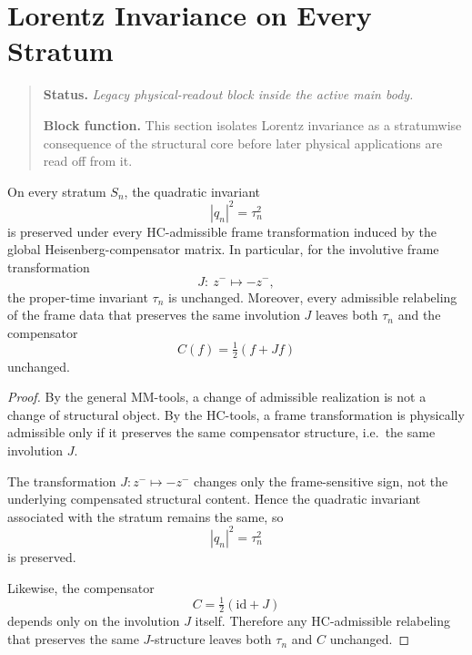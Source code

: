 \section{Lorentz Invariance on Every Stratum}
\begin{quote}\small
\noindent\textbf{Status.} \emph{Legacy physical-readout block inside the active main body.}\par
\noindent\textbf{Block function.} This section isolates Lorentz invariance as a stratumwise consequence of the structural core before later physical applications are read off from it.
\end{quote}
\label{sec:lorentz}

\begin{theorem}\label{thm:lorentz}
On every stratum $S_n$, the quadratic invariant
\[
|q_n|^2=\tau_n^2
\]
is preserved under every HC-admissible frame transformation induced by
the global Heisenberg-compensator matrix.
In particular, for the involutive frame transformation
\[
J:\ z^- \mapsto -z^-,
\]
the proper-time invariant $\tau_n$ is unchanged.
Moreover, every admissible relabeling of the frame data that preserves
the same involution $J$ leaves both $\tau_n$ and the compensator
\[
C(f)=\tfrac12(f+Jf)
\]
unchanged.
\end{theorem}

\begin{proof}
By the general MM-tools, a change of admissible realization is not a
change of structural object.
By the HC-tools, a frame transformation is physically admissible only if
it preserves the same compensator structure, i.e.\ the same involution
$J$.

The transformation $J:z^-\mapsto -z^-$ changes only the frame-sensitive
sign, not the underlying compensated structural content.
Hence the quadratic invariant associated with the stratum remains the
same, so
\[
|q_n|^2=\tau_n^2
\]
is preserved.

Likewise, the compensator
\[
C=\tfrac12(\mathrm{id}+J)
\]
depends only on the involution $J$ itself.
Therefore any HC-admissible relabeling that preserves the same
$J$-structure leaves both $\tau_n$ and $C$ unchanged.
\end{proof}


